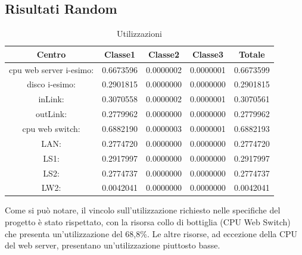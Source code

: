 \subsection{Risultati Random}
\begin{table}[H]
\begin{center}
\begin{tabular}{||c|c|c|c|c||}
\hline
Centro &Classe1 &Classe2 &Classe3 &Totale\\
\hline
\hline
 cpu web server i-esimo: 	&0.6673596	&0.0000002	&0.0000001	&0.6673599\\
\hline
 disco i-esimo: 	&0.2901815	&0.0000000	&0.0000000	&0.2901815\\
\hline
 inLink: 	&0.3070558	&0.0000002	&0.0000001	&0.3070561\\
\hline
 outLink: 	&0.2779962	&0.0000000	&0.0000000	&0.2779962\\
\hline
 cpu web switch: 	&0.6882190	&0.0000003	&0.0000001	&0.6882193\\
\hline
 LAN: 	&0.2774720	&0.0000000	&0.0000000	&0.2774720\\
\hline
 LS1: 	&0.2917997	&0.0000000	&0.0000000	&0.2917997\\
\hline
 LS2:	&0.2774737	&0.0000000	&0.0000000	&0.2774737\\
\hline
 LW2: 	&0.0042041	&0.0000000	&0.0000000	&0.0042041\\
\hline
\end{tabular}
\end{center}
\caption{Utilizzazioni}
\label{risrandom}
\end{table}
Come si può notare, il vincolo sull'utilizzazione richiesto nelle specifiche del progetto è stato rispettato, con la risorsa collo di bottiglia (CPU Web Switch) che presenta un'utilizzazione del 68,8\%. Le altre risorse, ad eccezione della CPU del web server, presentano un'utilizzazione piuttosto basse.

